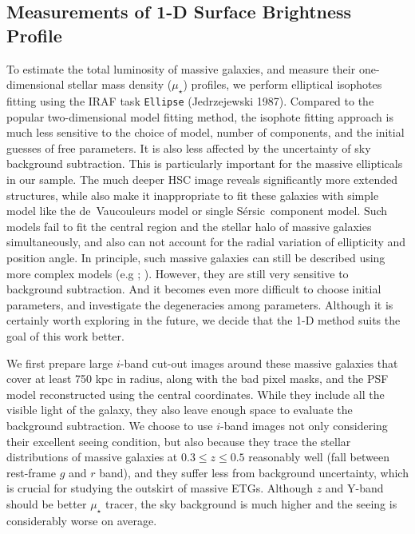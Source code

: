 \documentclass{emulateapj}
\def\ser{{S\'{e}rsic\ }}
\def\mden{{$\mu_{\star}$}}
\begin{document}
\begin{CJK*}{UTF8}{gbsn}


\section{Measurements of 1-D Surface Brightness Profile}
    \label{sec:ellipse}
    
    To estimate the total luminosity of massive galaxies, and measure their 
    one-dimensional stellar mass density (\mden{}) profiles, we perform elliptical 
    isophotes fitting using the IRAF task \texttt{Ellipse} (Jedrzejewski 1987).  
    Compared to the popular two-dimensional model fitting method, the isophote fitting
    approach is much less sensitive to the choice of model, number of components, 
    and the initial guesses of free parameters. 
    It is also less affected by the uncertainty of sky background subtraction.  
    This is particularly important for the massive ellipticals in our sample.  
    The much deeper HSC image reveals significantly more extended structures, 
    while also make it inappropriate to fit these galaxies with simple model like 
    the de~Vaucouleurs model or single \ser component model. 
    Such models fail to fit the central region and the stellar halo of massive 
    galaxies simultaneously, and also can not account for the radial variation of 
    ellipticity and position angle. 
    In principle, such massive galaxies can still be described using more complex 
    models (e.g \citealt{Huang2013a}; \citealt{Huang2013b}).  
    However, they are still very sensitive to background subtraction. 
    And it becomes even more difficult to choose initial parameters, and investigate
    the degeneracies among parameters. 
    Although it is certainly worth exploring in the future, we decide that the 1-D 
    method suits the goal of this work better.
        
    We first prepare large $i$-band cut-out images around these massive galaxies 
    that cover at least 750 kpc in radius, along with the bad pixel masks, and the 
    PSF model reconstructed using the central coordinates. 
    While they include all the visible light of the galaxy, they also leave enough 
    space to evaluate the background subtraction. 
    We choose to use $i$-band images not only considering their excellent seeing
    condition, but also because they trace the stellar distributions of massive 
    galaxies at $0.3 \leq z \leq 0.5$ reasonably well (fall between rest-frame $g$ 
    and $r$ band), and they suffer less from background uncertainty, which is crucial 
    for studying the outskirt of massive ETGs.  
    Although $z$ and Y-band should be better \mden{} tracer, the sky background 
    is much higher and the seeing is considerably worse on average. 
    

\end{CJK*}
\end{document}
